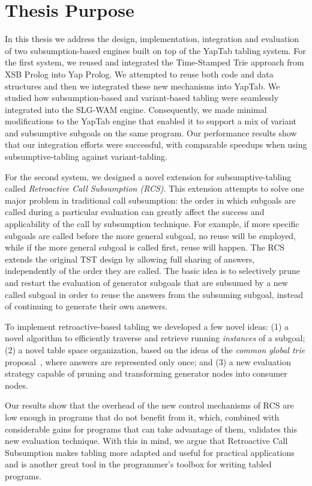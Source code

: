 \section{Thesis Purpose}

In this thesis we address the design, implementation, integration and evaluation of two subsumption-based engines
built on top of the YapTab tabling system. For the first system, we reused and integrated the Time-Stamped Trie
approach from XSB Prolog into Yap Prolog. We attempted to reuse both code and data structures and then
we integrated these new mechanisms into YapTab. We studied how subsumption-based and variant-based tabling were seamlessly
integrated into the SLG-WAM engine. Consequently, we made minimal modifications to the YapTab engine
that enabled it to support a mix of variant and subsumptive subgoals on the same program.
Our performance results show that our integration efforts were successful, with comparable
speedups when using subsumptive-tabling against variant-tabling.

For the second system, we designed a novel extension for subsumptive-tabling called
\emph{Retroactive Call Subsumption (RCS)}.
This extension attempts to solve one major problem in traditional call subsumption: the order in
which subgoals are called during a particular evaluation can greatly affect the success and applicability
of the call by subsumption technique. For example, if more specific subgoals are called before
the more general subgoal, no reuse will be employed, while if the more general subgoal is called first,
reuse will happen. The RCS extends the original TST design by allowing full sharing of answers, independently
of the order they are called. The basic idea is to selectively prune and restart the evaluation of generator
subgoals that are subsumed by a new called subgoal in order to reuse the answers from the subsuming subgoal,
instead of continuing to generate their own answers.

To implement retroactive-based tabling we developed a few novel ideas: (1) a novel algorithm to efficiently
traverse and retrieve running \emph{instances} of a subgoal; (2) a novel table space organization, based on
the ideas of the \emph{common global trie} proposal~\cite{CostaJ-08}, where answers are represented only
once; and (3) a new evaluation strategy capable of pruning and transforming generator nodes into consumer nodes.

Our results show that the overhead of the new control mechanisms of RCS are low enough in programs that do not
benefit from it, which, combined with considerable gains for programs that can take advantage of them, validates
this new evaluation technique. With this in mind, we argue that Retroactive Call Subsumption makes tabling
more adapted and useful for practical applications and is another great tool in the programmer's toolbox for
writing tabled programs.

